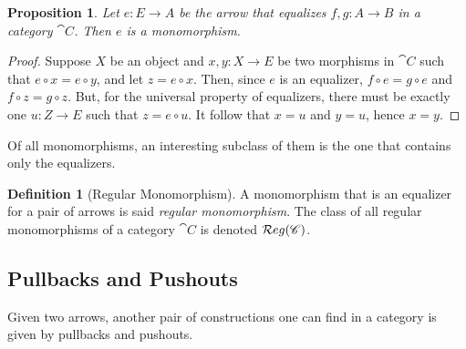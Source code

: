 \documentclass[a4paper, twoside,openright]{report}
\theoremstyle{plain}
\newtheorem{prop}[theorem]{Proposition}
\theoremstyle{definition}
\newtheorem{definition}[theorem]{Definition}
\begin{document}
\begin{prop}\label{prop:eq_are_mono}
    Let $e: E \rightarrow A$ be the arrow that equalizes $f, g : A \rightarrow B$ in a category $\cat C$. Then $e$ is a monomorphism.
\end{prop}

\begin{proof}
    Suppose $X$ be an object and $x, y: X \rightarrow E$ be two morphisms in $\cat C$ such that $e \circ x = e \circ y$, and let $z = e \circ x$. Then, since $e$ is an equalizer, $f \circ e = g \circ e$ and $f \circ z = g \circ z$. But, for the universal property of equalizers, there must be exactly one $u: Z \rightarrow E$ such that $z = e \circ u$. It follow that $x = u$ and $y = u$, hence $x = y$.
\end{proof}

Of all monomorphisms, an interesting subclass of them is the one that contains only the equalizers.

\begin{definition}[Regular Monomorphism]\label{def:reg_mono}
    A monomorphism that is an equalizer for a pair of arrows is said \emph{regular monomorphism}. The class of all regular monomorphisms of a category $\cat C$ is denoted $\mathcal{R}eg(\mathscr{C})$.
\end{definition}

\subsection{Pullbacks and Pushouts}

Given two arrows, another pair of constructions one can find in a category is given by pullbacks and pushouts.
\end{document}
